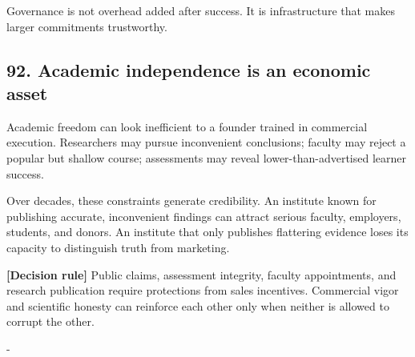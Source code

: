 Governance is not overhead added after success. It is infrastructure that makes larger commitments trustworthy.

\subsection{92. Academic independence is an economic asset}

Academic freedom can look inefficient to a founder trained in commercial execution. Researchers may pursue inconvenient conclusions; faculty may reject a popular but shallow course; assessments may reveal lower-than-advertised learner success.

Over decades, these constraints generate credibility. An institute known for publishing accurate, inconvenient findings can attract serious faculty, employers, students, and donors. An institute that only publishes flattering evidence loses its capacity to distinguish truth from marketing.

\textbf{\textbf{[Decision rule]}} Public claims, assessment integrity, faculty appointments, and research publication require protections from sales incentives. Commercial vigor and scientific honesty can reinforce each other only when neither is allowed to corrupt the other.

-


